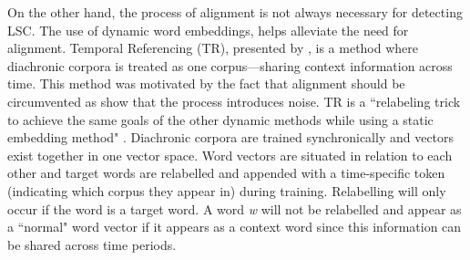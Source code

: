 On the other hand, the process of alignment is not always necessary for detecting LSC. The use of dynamic word embeddings, helps alleviate the need for alignment. Temporal Referencing (TR), presented by \citet{dubossarsky-etal-2019-time}, is a method where diachronic corpora is treated as one corpus—sharing context information across time. This method was motivated by the fact that alignment should be circumvented as \citet{dubossarsky-etal-2017-outta} show that the process introduces noise. TR is a ``relabeling trick to achieve the same goals of the other dynamic methods while using a static embedding method" \citep{tahmasebi-survey2018}. Diachronic corpora are trained synchronically and vectors exist together in one vector space. Word vectors are situated in relation to each other and target words are relabelled and appended with a time-specific token (indicating which corpus they appear in) during training. Relabelling will only occur if the word is a target word. A word \emph{w} will not be relabelled and appear as a ``normal" word vector if it appears as a context word since this information can be shared across time periods. 